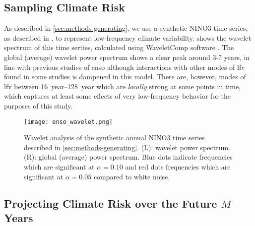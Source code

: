 \documentclass[
  draft,
  linenumbers
]{agujournal2018}
\begin{document}
\subsection{Sampling Climate Risk}\label{sec:supp-nino-spectrum}

As described in \cref{sec:methods-generating}, we use a synthetic NINO3 time series, as described in \citep{Ramesh:2016hf}, to represent low-frequency climate variability.
 shows the wavelet spectrum of this time serties, calculated using WaveletComp software \citep{Roesch:wlBQQoIs}.
The global (average) wavelet power spectrum shows a clear peak around 3-7 years, in line with previous studies of \gls{enso} although interactions with other modes of \acrfull{lfv} found in some studies \citep{Jin:1994wq} is dampened in this model.
There are, however, modes of \gls{lfv} between \SIrange{16}{128}{year} which are \emph{locally} strong at some points in time, which captures at least some effects of very low-frequency behavior for the purposes of this study.
\begin{figure}
  \texttt{[image: enso\_wavelet.png]}
  \caption{
    Wavelet analysis of the synthetic annual NINO3 time series described in \cref{sec:methods-generating}.
    (L): wavelet power spectrum.
    (R): global (average) power spectrum.
    Blue dots indicate frequencies which are significant at $\alpha=0.10$ and red dots frequencies which are significant at $\alpha=0.05$ compared to white noise.
  }\label{fig:enso-ts}
\end{figure}

\subsection{Projecting Climate Risk over the Future $M$ Years}
\end{document}
